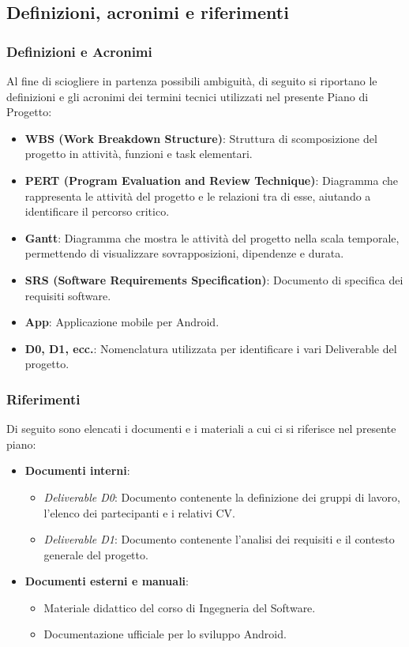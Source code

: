 \subsection{Definizioni, acronimi e riferimenti}

\subsubsection*{Definizioni e Acronimi}
Al fine di sciogliere in partenza possibili ambiguità, di seguito si riportano le definizioni e gli acronimi dei termini tecnici utilizzati nel presente Piano di Progetto:

\begin{itemize}
    \item \textbf{WBS (Work Breakdown Structure)}: Struttura di scomposizione del progetto in attività, funzioni e task elementari.
    \item \textbf{PERT (Program Evaluation and Review Technique)}: Diagramma che rappresenta le attività del progetto e le relazioni tra di esse, aiutando a identificare il percorso critico.
    \item \textbf{Gantt}: Diagramma che mostra le attività del progetto nella scala temporale, permettendo di visualizzare sovrapposizioni, dipendenze e durata.
    \item \textbf{SRS (Software Requirements Specification)}: Documento di specifica dei requisiti software.
    \item \textbf{App}: Applicazione mobile per Android.
    \item \textbf{D0, D1, ecc.}: Nomenclatura utilizzata per identificare i vari Deliverable del progetto.
\end{itemize}

\subsubsection*{Riferimenti}
Di seguito sono elencati i documenti e i materiali a cui ci si riferisce nel presente piano:

\begin{itemize}
    \item \textbf{Documenti interni}:
    \begin{itemize}
        \item \textit{Deliverable D0}: Documento contenente la definizione dei gruppi di lavoro, l'elenco dei partecipanti e i relativi CV.
        \item \textit{Deliverable D1}: Documento contenente l'analisi dei requisiti e il contesto generale del progetto.
    \end{itemize}
    \item \textbf{Documenti esterni e manuali}:
    \begin{itemize}
        \item Materiale didattico del corso di Ingegneria del Software.
        \item Documentazione ufficiale per lo sviluppo Android.
    \end{itemize}
\end{itemize}

